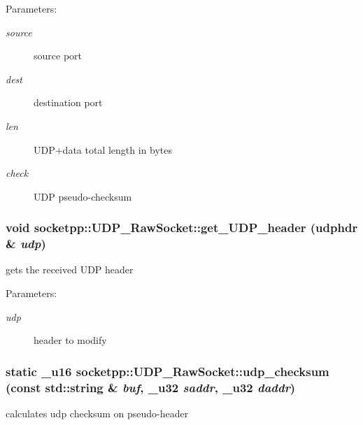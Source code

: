 \begin{Desc}
\item[Parameters:]
\begin{description}
\item[{\em source}]source port \item[{\em dest}]destination port \item[{\em len}]UDP+data total length in bytes \item[{\em check}]UDP pseudo-checksum \end{description}
\end{Desc}
\hypertarget{classsocketpp_1_1UDP__RawSocket_597a30fc537dce06c85663add29defdc}{
\subsubsection[{get\_\-UDP\_\-header}]{\setlength{\rightskip}{0pt plus 5cm}void socketpp::UDP\_\-RawSocket::get\_\-UDP\_\-header (udphdr \& {\em udp})}}
\label{classsocketpp_1_1UDP__RawSocket_597a30fc537dce06c85663add29defdc}


gets the received UDP header 

\begin{Desc}
\item[Parameters:]
\begin{description}
\item[{\em udp}]header to modify \end{description}
\end{Desc}
\hypertarget{classsocketpp_1_1UDP__RawSocket_912bdb1e33f25bb30f7c49f9906344c5}{
\subsubsection[{udp\_\-checksum}]{\setlength{\rightskip}{0pt plus 5cm}static \_\-u16 socketpp::UDP\_\-RawSocket::udp\_\-checksum (const std::string \& {\em buf}, \/  \_\-u32 {\em saddr}, \/  \_\-u32 {\em daddr})}}
\label{classsocketpp_1_1UDP__RawSocket_912bdb1e33f25bb30f7c49f9906344c5}


calculates udp checksum on pseudo-header 

